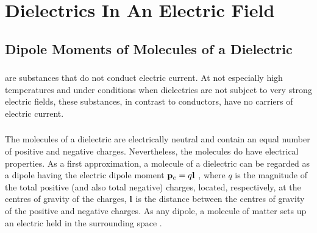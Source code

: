 





\chapter{Dielectrics In An Electric Field}
\label{ch-18}

\section{Dipole Moments of Molecules of a Dielectric}
\label{sec-18.1}

\subsection{}\label{18.1.1}  are substances that do not conduct electric current. At not especially high temperatures and under conditions when dielectrics are not subject to very strong electric fields, these substances, in contrast to conductors, have no carriers of electric current.

\subsection{}\label{18.1.2} The molecules of a dielectric are electrically neutral and contain an equal number of positive and negative charges. Nevertheless, the molecules do have electrical properties. As a first approximation, a molecule of a dielectric can be regarded as a dipole having the electric dipole moment $\vb{p}_{e} =q \vb{l}$ , where $q$ is the magnitude of the total positive (and also total negative) charges, located, respectively, at the centres of gravity of the charges, $\vb{l}$ is the distance between the centres of gravity of the positive and negative charges. As any dipole, a molecule of matter sets up an electric held in the surrounding space .

